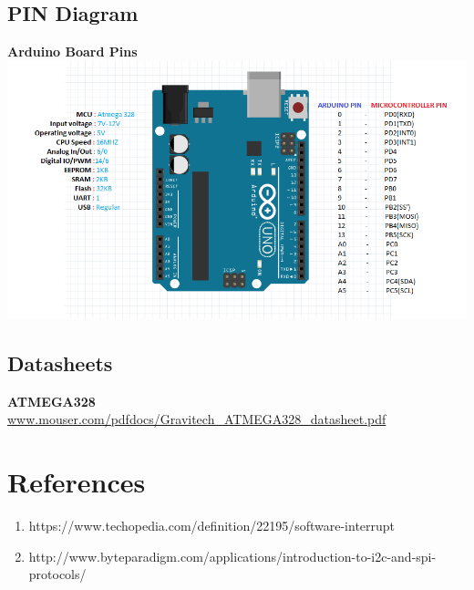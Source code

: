 \documentclass[11pt,a4paper]{article}
\begin{document}
	\subsection{PIN Diagram}
	\textbf{Arduino Board Pins}
	\includegraphics[scale=0.7]{arduino.png}  
	\newline
	\subsection{Datasheets}
	\textbf{ATMEGA328} \\
	\url{www.mouser.com/pdfdocs/Gravitech_ATMEGA328_datasheet.pdf}\\
	
	\section{References}
	\begin{enumerate}
		\item https://www.techopedia.com/definition/22195/software-interrupt
		\item http://www.byteparadigm.com/applications/introduction-to-i2c-and-spi-protocols/
	\end{enumerate}
	
\end{document}
